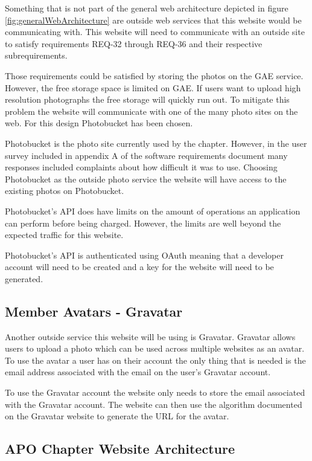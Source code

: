 \documentclass{article}
\begin{document}
Something that is not part of the general web architecture depicted in figure \ref{fig:generalWebArchitecture} are outside
web services that this website would be communicating with. This website will need to communicate with an outside site to satisfy requirements REQ-32 through REQ-36 and their respective subrequirements. \cite{schwab_apo_srs_2012}

Those requirements could be satisfied by storing the photos on the GAE service. However, the free storage space is limited
on GAE. If users want to upload high resolution photographs the free storage will quickly run out. To mitigate this problem
the website will communicate with one of the many photo sites on the web. For this design Photobucket has been chosen. \cite{_photobucket_2012}

Photobucket is the photo site currently used by the chapter. However, in the user survey included in appendix A of 
the software requirements document many responses included complaints about how difficult it was to use.\cite{schwab_apo_srs_2012}  Choosing Photobucket as the outside photo service the website will have access to the existing photos on Photobucket.

Photobucket's API does have limits on the amount of operations an application can perform before being charged. \cite{photobucket_method_2010} However, the limits are well beyond the expected traffic for this website.

Photobucket's API is authenticated using OAuth meaning that a developer account will need to be created and a key for the
website will need to be generated. \cite{photobucket_faq_2010}

\subsection{Member Avatars - Gravatar}

Another outside service this website will be using is Gravatar. \cite{_gravatar} Gravatar allows users to upload a photo which can be used across multiple websites as an avatar. To use the avatar a user has on their account the only thing that is needed
is the email address associated with the email on the user's Gravatar account. 

To use the Gravatar account the website only needs to store the email associated with the Gravatar account. The website
can then use the algorithm documented on the Gravatar website to generate the URL for the avatar.

\subsection{APO Chapter Website Architecture}
\end{document}

